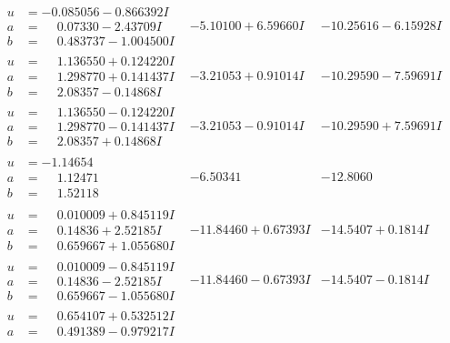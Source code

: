 \documentclass[1p]{elsarticle_modified}
\theoremstyle{definition}
\begin{document}
$$\begin{array}{c|c|c}
\begin{aligned}
u &= -0.085056 - 0.866392 I \\
a &= \phantom{-}0.07330 - 2.43709 I \\
b &= \phantom{-}0.483737 - 1.004500 I\end{aligned}
 & -5.10100 + 6.59660 I & -10.25616 - 6.15928 I \\ \hline\begin{aligned}
u &= \phantom{-}1.136550 + 0.124220 I \\
a &= \phantom{-}1.298770 + 0.141437 I \\
b &= \phantom{-}2.08357 - 0.14868 I\end{aligned}
 & -3.21053 + 0.91014 I & -10.29590 - 7.59691 I \\ \hline\begin{aligned}
u &= \phantom{-}1.136550 - 0.124220 I \\
a &= \phantom{-}1.298770 - 0.141437 I \\
b &= \phantom{-}2.08357 + 0.14868 I\end{aligned}
 & -3.21053 - 0.91014 I & -10.29590 + 7.59691 I \\ \hline\begin{aligned}
u &= -1.14654\phantom{ +0.000000I} \\
a &= \phantom{-}1.12471\phantom{ +0.000000I} \\
b &= \phantom{-}1.52118\phantom{ +0.000000I}\end{aligned}
 & -6.50341\phantom{ +0.000000I} & -12.8060\phantom{ +0.000000I} \\ \hline\begin{aligned}
u &= \phantom{-}0.010009 + 0.845119 I \\
a &= \phantom{-}0.14836 + 2.52185 I \\
b &= \phantom{-}0.659667 + 1.055680 I\end{aligned}
 & -11.84460 + 0.67393 I & -14.5407 + 0.1814 I \\ \hline\begin{aligned}
u &= \phantom{-}0.010009 - 0.845119 I \\
a &= \phantom{-}0.14836 - 2.52185 I \\
b &= \phantom{-}0.659667 - 1.055680 I\end{aligned}
 & -11.84460 - 0.67393 I & -14.5407 - 0.1814 I \\ \hline\begin{aligned}
u &= \phantom{-}0.654107 + 0.532512 I \\
a &= \phantom{-}0.491389 - 0.979217 I \\

\end{aligned}
\end{array}$$
\end{document}
